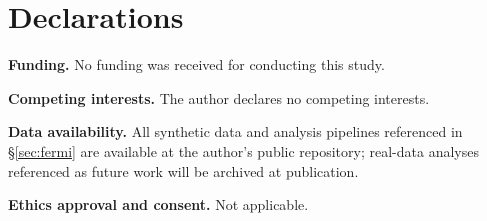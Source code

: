 \documentclass[11pt,a4paper,twocolumn]{article}
\begin{document}
\section*{Declarations}

\noindent\textbf{Funding.} No funding was received for conducting this
study.

\noindent\textbf{Competing interests.} The author declares no competing
interests.

\noindent\textbf{Data availability.} All synthetic data and analysis
pipelines referenced in \S\ref{sec:fermi} are available at the author's
public repository; real-data analyses referenced as future work will be
archived at publication.

\noindent\textbf{Ethics approval and consent.} Not applicable.
\end{document}
